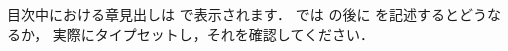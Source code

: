 \begin{Prob}
目次中における章見出しは で表示されます．
では の後に を記述するとどうなるか，
実際にタイプセットし，それを確認してください．

\begin{InTeX}
\renewcommand*{\l@chapter}[2]{%
  \ifnum \c@tocdepth >\m@ne
    \addpenalty{-\@highpenalty}%
    \addvspace{1.0em \@plus\p@}
    \begingroup
      \parindent\z@
      \rightskip\@tocrmarg
      \parfillskip-\rightskip
      \leavevmode \large \headfont %
      \setlength\@lnumwidth{4.683zw}%
      \advance\leftskip\@lnumwidth \hskip-\leftskip
      #1\nobreak\hfil\nobreak\hbox to\@pnumwidth{\hss#2}\par
      \penalty\@highpenalty
    \endgroup
  \fi} 
\end{InTeX}
\end{Prob}




